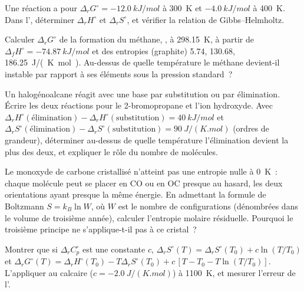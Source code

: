 \begin{exercise}[$\star\star$]\label{exo:b2:reaction-free-energy:7}
Une réaction a pour $\Delta_r G^\circ = \qty{-12.0}{kJ/mol}$ à \qty{300}{K}
et $\qty{-4.0}{kJ/mol}$ à \qty{400}{K}. Dans l',
déterminer $\Delta_r H^\circ$ et $\Delta_r S^\circ$, et vérifier la
relation de Gibbs--Helmholtz.
\end{exercise}

\begin{exercise}[$\star\star$]\label{exo:b2:reaction-free-energy:8}
Calculer $\Delta_r G^\circ$ de la formation du méthane, , à \qty{298.15}{K}, à partir de $\Delta_f H^\circ = \qty{-74.87}{kJ/mol}$
et des entropies  (graphite) 5.74,  130.68, 
\qty{186.25}{J/(K.mol)}. Au-dessus de quelle température le méthane devient-il
instable par rapport à ses éléments sous la pression standard~?
\end{exercise}

\begin{exercise}[$\star\star$]\label{exo:b2:reaction-free-energy:9}
Un halogénoalcane réagit avec une base par substitution ou par élimination. Écrire
les deux réactions pour le 2-bromopropane et l'ion hydroxyde. Avec $\Delta_r
H^\circ(\text{élimination}) - \Delta_r H^\circ(\text{substitution}) =
\qty{+40}{kJ/mol}$ et $\Delta_r S^\circ(\text{élimination}) - \Delta_r
S^\circ(\text{substitution}) = \qty{+90}{J/(K.mol)}$ (ordres de grandeur),
déterminer au-dessus de quelle température l'élimination devient la plus  des
deux, et expliquer le rôle du nombre de molécules.
\end{exercise}

\begin{exercise}[$\star\star\star$]\label{exo:b2:reaction-free-energy:10}
Le monoxyde de carbone cristallisé n'atteint pas une entropie nulle à \qty{0}{K}~: chaque
molécule peut se placer en CO ou en OC presque au hasard, les deux orientations ayant
presque la même énergie. En admettant la formule de Boltzmann $S = k_B\ln W$, où
$W$ est le nombre de configurations (dénombrées dans le volume de troisième année), calculer
l'entropie molaire résiduelle. Pourquoi le troisième principe ne s'applique-t-il pas à ce
cristal~?
\end{exercise}

\begin{exercise}[$\star\star\star$]\label{exo:b2:reaction-free-energy:11}
Montrer que si $\Delta_r C^\circ_p$ est une constante $c$,
$\Delta_r S^\circ(T) = \Delta_r S^\circ(T_0) + c\ln(T/T_0)$ et
$\Delta_r G^\circ(T) = \Delta_r H^\circ(T_0) - T\Delta_r S^\circ(T_0) +
c\,[T - T_0 - T\ln(T/T_0)]$. L'appliquer au calcaire ($c =
\qty{-2.0}{J/(K.mol)}$) à \qty{1100}{K}, et mesurer l'erreur de
l'.
\end{exercise}

